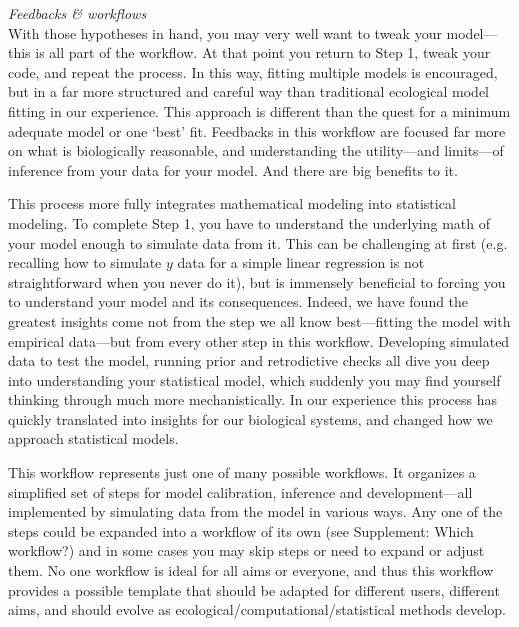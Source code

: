 \documentclass[11pt]{article}
\begin{document}
{\emph{Feedbacks \& workflows}\\
With those hypotheses in hand, you may very well want to tweak your model---this is all part of the workflow. At that point you return to Step 1, tweak your code, and repeat the process. In this way, fitting multiple models is encouraged, but in a far more structured and careful way than traditional ecological model fitting in our experience. This approach is different than the quest for a minimum adequate model or one `best' fit. Feedbacks in this workflow are focused far more on what is biologically reasonable, and understanding the utility---and limits---of inference from your data for your model.  And there are big benefits to it. 

This process more fully integrates mathematical modeling into statistical modeling. To complete Step 1, you have to understand the underlying math of your model enough to simulate data from it. This can be challenging at first (e.g. recalling how to simulate $y$ data for a simple linear regression is not straightforward when you never do it), but is immensely beneficial to forcing you to understand your model and its consequences. Indeed, we have found the greatest insights come not from the step we all know best---fitting the model with empirical data---but from every other step in this workflow. Developing simulated data to test the model, running prior and retrodictive checks all dive you deep into understanding your statistical model, which suddenly you may find yourself thinking through much more mechanistically. In our experience this process has quickly translated into insights for our biological systems, and changed how we approach statistical models. %

This workflow represents just one of many possible workflows. It organizes a simplified set of steps for model calibration, inference and development---all implemented by simulating data from the model in various ways. Any one of the steps could be expanded into a workflow of its own (see Supplement: Which workflow?) and in some cases you may skip steps or need to expand or adjust them. No one workflow is ideal for all aims or everyone, and thus this workflow provides a possible template that should be adapted for different users, different aims, and should evolve as ecological/computational/statistical methods develop. 

}
\end{document}
